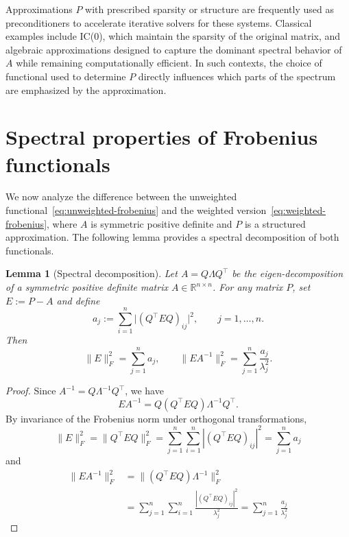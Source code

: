 \documentclass[conference]{IEEEtran}
\newtheorem{lemma}[theorem]{Lemma}
\begin{document}
Approximations $P$ with prescribed sparsity or structure are frequently used as preconditioners to accelerate iterative solvers for these systems. Classical examples include IC(0), which maintain the sparsity of the original matrix, and algebraic approximations designed to capture the dominant spectral behavior of $A$ while remaining computationally efficient. In such contexts, the choice of functional used to determine $P$ directly influences which parts of the spectrum are emphasized by the approximation.

\section{Spectral properties of Frobenius functionals}

We now analyze the difference between the unweighted functional~\eqref{eq:unweighted-frobenius}
and the weighted version~\eqref{eq:weighted-frobenius}, where $A$ is symmetric positive definite and $P$ is a structured approximation. The following lemma provides a spectral decomposition of both functionals.

\begin{lemma}[Spectral decomposition]\label{lem:spectral-objectives}
Let $A = Q \Lambda Q^\top$ be the eigen-decomposition of a symmetric positive definite matrix 
$A \in \mathbb{R}^{n \times n}$.%
For any matrix $P$, set $E := P - A$ and define
\begin{equation*}
a_j := \sum_{i=1}^n \big|(Q^\top E Q)_{ij}\big|^2, \qquad j=1,\dots,n.
\end{equation*}
Then
\begin{equation*}
\|E\|_F^2 = \sum_{j=1}^n a_j,
\qquad
\|E A^{-1}\|_F^2 = \sum_{j=1}^n \frac{a_j}{\lambda_j^2}.
\end{equation*}
\end{lemma}

\begin{proof}
Since $A^{-1} = Q \Lambda^{-1} Q^\top$, we have
\begin{equation*}
E A^{-1} = Q (Q^\top E Q) \Lambda^{-1} Q^\top.
\end{equation*}
By invariance of the Frobenius norm under orthogonal transformations,
\begin{equation*}
\|E\|_F^2 = \|Q^\top E Q\|_F^2 = \sum_{j=1}^n \sum_{i=1}^n |(Q^\top E Q)_{ij}|^2 = \sum_{j=1}^n a_j
\end{equation*}
and
\begin{align*}
\|E A^{-1}\|_F^2 &= \|(Q^\top E Q)\Lambda^{-1}\|_F^2 \nonumber \\
&= \sum_{j=1}^n \sum_{i=1}^n \frac{|(Q^\top E Q)_{ij}|^2}{\lambda_j^2} = \sum_{j=1}^n \frac{a_j}{\lambda_j^2}
\end{align*}
\end{proof}
\end{document}
